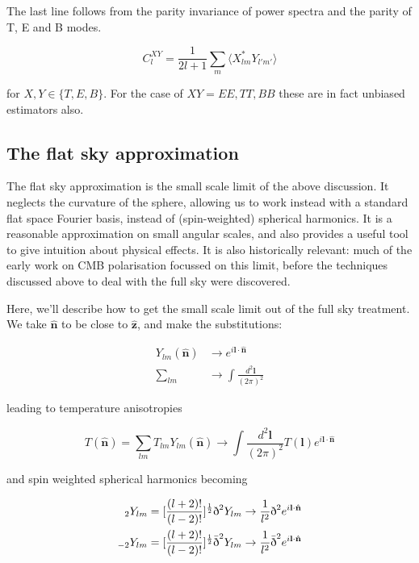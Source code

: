 \documentclass[a4paper,10pt]{article}
\renewcommand{\v}[1]{\mathbf{#1}}
\newcommand{\half}{\frac{1}{2}}
\newcommand{\finttwo}[1]{\int \frac{d^2 \v{#1}}{(2\pi)^2}}
\newcommand{\unit}[1]{\hat{\v{#1}}}
\newcommand{\sr}{\text{\normalfont\dh}}
\renewcommand{\sl}{\bar{\text{\normalfont\dh}}}
\newcommand{\ltwo}{[\frac{(l+2)!}{(l-2)!}]}
\begin{document}
The last line follows from the parity invariance of power spectra and the parity of T, E and B modes.

\begin{equation}
C_l^{XY} = \frac{1}{2l+1}\sum_m \langle X_{lm}^*Y_{l'm'}\rangle
\label{powerspectra}
\end{equation}

for $X,Y \in \{T, E,B\}$. For the case of $XY = EE, TT, BB$ these are in fact unbiased estimators also.



\subsection{The flat sky approximation}

The flat sky approximation is the small scale limit of the above discussion. It neglects the curvature of the sphere, allowing us to work instead with a standard flat space Fourier basis, instead of (spin-weighted) spherical harmonics. It is a reasonable approximation on small angular scales, and also provides a useful tool to give intuition about physical effects. It is also historically relevant: much of the early work on CMB polarisation focussed on this limit, before the techniques discussed above to deal with the full sky were discovered. 

Here, we'll describe how to get the small scale limit out of the full sky treatment.  We take $\unit{n}$ to be close to $\unit{z}$, and make the substitutions:

\begin{equation}
\begin{split}
Y_{lm}(\unit{n}) &\rightarrow e^{i\v{l}\cdot\unit{n}}\\
\sum_{lm} &\rightarrow \finttwo{l}
\end{split}
\end{equation}

leading to temperature anisotropies

\begin{equation}
T(\unit{n}) = \sum_{lm} T_{lm}Y_{lm}(\unit{n})\rightarrow \finttwo{l} T(\v{l})e^{i\v{l}\cdot\unit{n}}
\end{equation}

and spin weighted spherical harmonics becoming 

\begin{equation}\begin{split}
{}_2Y_{lm} &= \ltwo^\half\sr^2Y_{lm} \rightarrow \frac{1}{l^2}\sr^2e^{i\v{l}\cdot\unit{n}}\\
{}_{-2}Y_{lm} &= \ltwo^\half\sl^2Y_{lm} \rightarrow  \frac{1}{l^2}\sl^2e^{i\v{l}\cdot\unit{n}}
\end{split}\end{equation}
\end{document}
